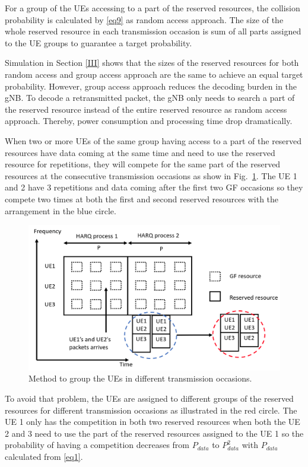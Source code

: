 \documentclass[conference]{IEEEtran}
\begin{document}
For a group of the UEs accessing to a part of the reserved resources, the collision probability is calculated by \eqref{eq9} as random access approach. The size of the whole reserved resource in each transmission occasion is sum of all parts assigned to the UE groups to guarantee a target probability. 

Simulation in Section \ref{III} shows that the sizes of the reserved resources for both random access and group access approach are the same to achieve an equal target probability. However, group access approach reduces the decoding burden in the gNB. To decode a retransmitted packet, the gNB only needs to search a part of the reserved resource instead of the entire reserved resource as random access approach. Thereby, power consumption and processing time drop dramatically. 

When two or more UEs of the same group having access to a part of the reserved resources have data coming at the same time and need to use the reserved resource for repetitions, they will compete for the same part of the reserved resources at the consecutive transmission occasions as show in Fig.~\ref{fig5}. The UE 1 and 2 have 3 repetitions and data coming after the first two GF occasions so they compete two times at both the first and second reserved resources with the arrangement in the blue circle.

\begin{figure}[tbp]
\centerline{\includegraphics[scale=0.2]{fig5.png}}
\caption{Method to group the UEs in different transmission occasions.}
\label{fig5}
\vspace{-6mm}
\end{figure}

To avoid that problem, the UEs are assigned to different groups of the reserved resources for different transmission occasions as illustrated in the red circle. The UE 1 only has the competition in both two reserved resources when both the UE 2 and 3 need to use the part of the reserved resources assigned to the UE 1 so the probability of having a competition decreases from $P_{data}$ to $P_{data}^2$ with $P_{data}$ calculated from \eqref{eq1}.
\end{document}

